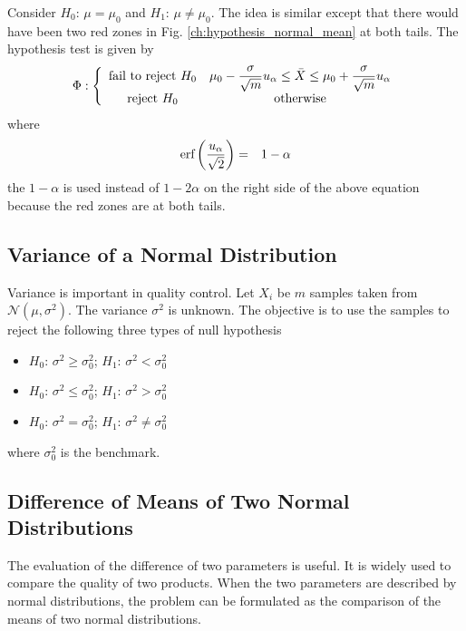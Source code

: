 Consider $H_0$: $\mu = \mu_0$ and  $H_1$: $\mu \neq \mu_0$. The idea is similar except that there would have been two red zones in Fig. \ref{ch:hypothesis_normal_mean} at both tails. The hypothesis test is given by
\begin{eqnarray}
	\Phi : \left\{\begin{array}{cc}
		\textup{fail to reject~} H_0 & \mu_0 - \dfrac{\sigma}{\sqrt{m}}u_\alpha \leq \bar{X} \leq  \mu_0 + \dfrac{\sigma}{\sqrt{m}}u_\alpha \\
		\textup{reject~} H_0 & \textup{otherwise}
	\end{array}\right. \nonumber
\end{eqnarray}
where
\begin{eqnarray}
	\textup{erf}\left(\dfrac{u_\alpha}{\sqrt{2}}\right) &=& 1-\alpha \nonumber
\end{eqnarray}
the $1-\alpha$ is used instead of $1-2\alpha$ on the right side of the above equation because the red zones are at both tails.

\subsection{Variance of a Normal Distribution}

Variance is important in quality control. Let $X_i$ be $m$ samples taken from $\mathcal{N}(\mu, \sigma^2)$. The variance $\sigma^2$ is unknown. The objective is to use the samples to reject the following three types of null hypothesis
\begin{itemize}
	\item $H_0$: $\sigma^2 \geq \sigma_0^2$; $H_1$: $\sigma^2 < \sigma_0^2$
	\item $H_0$: $\sigma^2 \leq \sigma_0^2$; $H_1$: $\sigma^2 > \sigma_0^2$
	\item $H_0$: $\sigma^2 = \sigma_0^2$; $H_1$: $\sigma^2 \neq \sigma_0^2$
\end{itemize}
where $\sigma_0^2$ is the benchmark.

\subsection{Difference of Means of Two Normal Distributions}

The evaluation of the difference of two parameters is useful. It is widely used to compare the quality of two products. When the two parameters are described by normal distributions, the problem can be formulated as the comparison of the means of two normal distributions.

